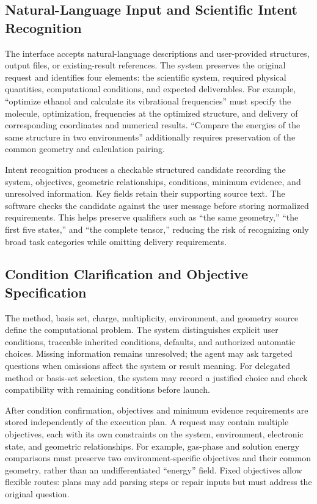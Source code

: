 \subsection{Natural-Language Input and Scientific Intent Recognition}
The interface accepts natural-language descriptions and user-provided structures, output files, or existing-result references.
The system preserves the original request and identifies four elements: the scientific system, required physical quantities, computational conditions, and expected deliverables.
For example, ``optimize ethanol and calculate its vibrational frequencies'' must specify the molecule, optimization, frequencies at the optimized structure, and delivery of corresponding coordinates and numerical results.
``Compare the energies of the same structure in two environments'' additionally requires preservation of the common geometry and calculation pairing.

Intent recognition produces a checkable structured candidate recording the system, objectives, geometric relationships, conditions, minimum evidence, and unresolved information.
Key fields retain their supporting source text.
The software checks the candidate against the user message before storing normalized requirements.
This helps preserve qualifiers such as ``the same geometry,'' ``the first five states,'' and ``the complete tensor,'' reducing the risk of recognizing only broad task categories while omitting delivery requirements.

\subsection{Condition Clarification and Objective Specification}
The method, basis set, charge, multiplicity, environment, and geometry source define the computational problem.
The system distinguishes explicit user conditions, traceable inherited conditions, defaults, and authorized automatic choices.
Missing information remains unresolved; the agent may ask targeted questions when omissions affect the system or result meaning.
For delegated method or basis-set selection, the system may record a justified choice and check compatibility with remaining conditions before launch.

After condition confirmation, objectives and minimum evidence requirements are stored independently of the execution plan.
A request may contain multiple objectives, each with its own constraints on the system, environment, electronic state, and geometric relationships.
For example, gas-phase and solution energy comparisons must preserve two environment-specific objectives and their common geometry, rather than an undifferentiated ``energy'' field.
Fixed objectives allow flexible routes: plans may add parsing steps or repair inputs but must address the original question.

